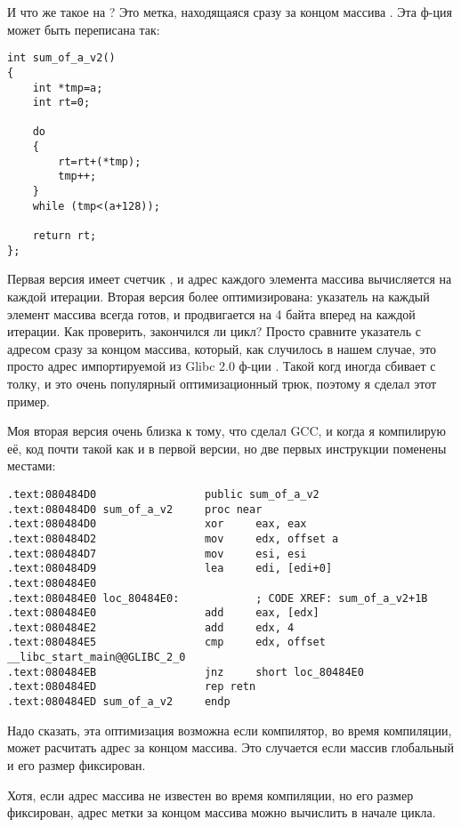 И что же такое  на ?
Это метка, находящаяся сразу за концом массива .
Эта ф-ция может быть переписана так:

\begin{lstlisting}[style=customc]
int sum_of_a_v2()
{
	int *tmp=a;
	int rt=0;
	
	do
	{
		rt=rt+(*tmp);
		tmp++;
	}
	while (tmp<(a+128));

	return rt;
};
\end{lstlisting}

Первая версия имеет счетчик , и адрес каждого элемента массива вычисляется на каждой итерации.
Вторая версия более оптимизирована: указатель на каждый элемент массива всегда готов, и продвигается на 4 байта вперед
на каждой итерации.
Как проверить, закончился ли цикл?
Просто сравните указатель с адресом сразу за концом массива, который, как случилось в нашем случае, это просто адрес
импортируемой из Glibc 2.0 ф-ции .
Такой когд иногда сбивает с толку, и это очень популярный оптимизационный трюк, поэтому я сделал этот пример.

Моя вторая версия очень близка к тому, что сделал GCC, и когда я компилирую её, код почти такой как и в первой версии,
но две первых инструкции поменены местами:

\begin{lstlisting}[style=customasmx86]
.text:080484D0                 public sum_of_a_v2
.text:080484D0 sum_of_a_v2     proc near
.text:080484D0                 xor     eax, eax
.text:080484D2                 mov     edx, offset a
.text:080484D7                 mov     esi, esi
.text:080484D9                 lea     edi, [edi+0]
.text:080484E0
.text:080484E0 loc_80484E0:            ; CODE XREF: sum_of_a_v2+1B
.text:080484E0                 add     eax, [edx]
.text:080484E2                 add     edx, 4
.text:080484E5                 cmp     edx, offset __libc_start_main@@GLIBC_2_0
.text:080484EB                 jnz     short loc_80484E0
.text:080484ED                 rep retn
.text:080484ED sum_of_a_v2     endp
\end{lstlisting}

Надо сказать, эта оптимизация возможна если компилятор, во время компиляции, может расчитать адрес за концом массива.
Это случается если массив глобальный и его размер фиксирован.

Хотя, если адрес массива не известен во время компиляции, но его размер фиксирован, адрес метки за концом массива
можно вычислить в начале цикла.

